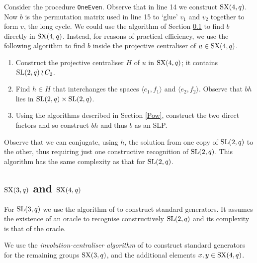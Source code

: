 \documentclass[12pt]{article}
\def\SL{{\rm SL}}
\def\GL{{\rm GL}}
\def\Oh{O}  %
\def\SX{{\rm SX}}
\def\SLP{{\rm SLP}}
\begin{document}
Consider the procedure {\tt OneEven}.
Observe that in line 14 we construct $\SX(4, q)$.
Now $b$ is the permutation matrix used in line 15 to 
`glue' $v_1$ and $v_2$ together to form $v$, the long cycle. 
We could use the algorithm of Section \ref{ryba-base} to find
$b$ directly in $\SX(4, q)$.
Instead, for reasons of practical efficiency, we 
use the following algorithm to 
find $b$ inside the projective centraliser of $u \in \SX(4, q)$. 

\begin{enumerate}
\item 
Construct the projective
centraliser $H$ of $u$ in $\SX(4,q)$; it contains 
$\SL(2,q)\wr C_2$.

\item 
Find $h\in H$ that 
interchanges the spaces $\langle e_1,f_1\rangle$ and $\langle
e_2,f_2\rangle$. 
Observe that $bh$ lies in $\SL(2,q)\times\SL(2,q)$.  

\item 
Using the algorithms described in Section \ref{Pow}, 
construct the two direct factors
and so construct $bh$ and thus $b$ as an \SLP.  
\end{enumerate}
Observe that we can conjugate, using $h$, the solution from one 
copy of $\SL(2, q)$ to the other, thus 
requiring just one constructive recognition of $\SL(2, q)$.
This algorithm has the same complexity as that for $\SL(2, q)$. 

\subsection{$\SX(3, q)$ and $\SX(4, q)$}
\label{ryba-base}
For $\SL(3,q)$ we use the algorithm of \cite{sl3q}
to construct standard generators.
It assumes the existence of an oracle
to recognise constructively $\SL(2, q)$
and its complexity is that of the oracle.

We use the {\it involution-centraliser algorithm} of \cite{Ryba-paper}
to construct standard generators for the remaining groups $\SX(3,q)$, 
and the additional elements $x, y \in \SX(4, q)$.  
\end{document}
